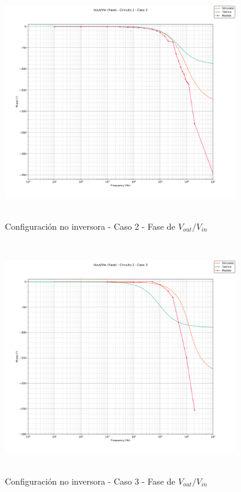 \begin{figure}[H] %
	\centering
	\includegraphics[width=10cm,height=10cm,keepaspectratio]{../EJ1/00GRAFICOS/c2c2/c2c2voviFASE.png}
	\caption{Configuración no inversora - Caso 2 - Fase de $V_{out}/V_{in}$}
	\label{c2c2voviP}
\end{figure}


\begin{figure}[H] %
	\centering
	\includegraphics[width=10cm,height=10cm,keepaspectratio]{../EJ1/00GRAFICOS/c2c3/c2c3voviFASE.png}
	\caption{Configuración no inversora - Caso 3 - Fase de $V_{out}/V_{in}$}
	\label{c2c3voviP}
\end{figure}



